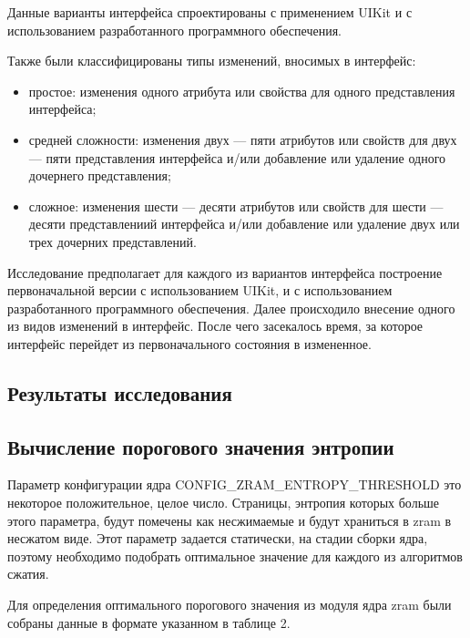 Данные варианты интерфейса спроектированы с применением UIKit и с использованием разработанного программного обеспечения.

Также были классифицированы типы изменений, вносимых в интерфейс:
\begin{itemize}[label=---]
	\item простое: изменения одного атрибута или свойства для одного представления интерфейса;
	\item средней сложности: изменения двух --- пяти атрибутов или свойств для двух --- пяти представления интерфейса и/или добавление или удаление одного дочернего представления;
	\item сложное: изменения шести --- десяти атрибутов или свойств для шести --- десяти представлениий интерфейса и/или добавление или удаление двух или трех дочерних представлений.
\end{itemize}		

Исследование предполагает для каждого из вариантов интерфейса построение первоначальной версии с использованием UIKit, и с использованием разработанного программного обеспечения.
Далее происходило внесение одного из видов изменений в интерфейс.
После чего засекалось время, за которое интерфейс перейдет из первоначального состояния в измененное. 

\subsection{Результаты исследования}

\subsection{Вычисление порогового значения энтропии}

Параметр конфигурации ядра CONFIG\_ZRAM\_ENTROPY\_THRESHOLD это некоторое положительное, целое число. Страницы, энтропия которых больше этого параметра, будут помечены как несжимаемые и будут храниться в zram в несжатом виде. Этот параметр задается статически, на стадии сборки ядра, поэтому необходимо подобрать оптимальное значение для каждого из алгоритмов сжатия.

Для определения оптимального порогового значения из модуля ядра zram были собраны данные в формате указанном в таблице 2.

